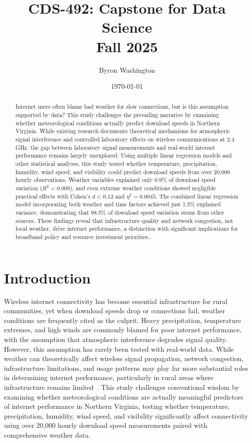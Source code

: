 \documentclass[10pt,final,journal,compsoc,letterpaper,twocolumn]{IEEEtran}
\begin{document}
\title{CDS-492:  Capstone for Data Science \\ Fall 2025}
\author{Byron Washington}
\date{\today}
\maketitle

\begin{abstract}
Internet users often blame bad weather for slow connections, but is this assumption supported by data? This study challenges the prevailing narrative by examining whether meteorological conditions actually predict download speeds in Northern Virginia. While existing research documents theoretical mechanisms for atmospheric signal interference and controlled laboratory effects on wireless communications at 2.4 GHz, the gap between laboratory signal measurements and real-world internet performance remains largely unexplored. Using multiple linear regression models and other statistical analyses, this study tested whether temperature, precipitation, humidity, wind speed, and visibility could predict download speeds from over 20,000 hourly observations. Weather variables explained only 0.9\% of download speed variation ($R^2 = 0.009$), and even extreme weather conditions showed negligible practical effects with Cohen's $d < 0.12$ and $\eta^2 = 0.0045$. The combined linear regression model incorporating both weather and time factors achieved just 1.5\% explained variance, demonstrating that 98.5\% of download speed variation stems from other sources. These findings reveal that infrastructure quality and network congestion, not local weather, drive internet performance, a distinction with significant implications for broadband policy and resource investment priorities..
\end{abstract}

\tableofcontents

\section{Introduction}

Wireless internet connectivity has become essential infrastructure for rural communities, yet when download speeds drop or connections fail, weather conditions are frequently cited as the culprit. Heavy precipitation, temperature extremes, and high winds are commonly blamed for poor internet performance, with the assumption that atmospheric interference degrades signal quality. However, this assumption has rarely been tested with real-world data. While weather can theoretically affect wireless signal propagation, network congestion, infrastructure limitations, and usage patterns may play far more substantial roles in determining internet performance, particularly in rural areas where infrastructure remains limited~\cite{changelabsolutions2024broadband}. This study challenges conventional wisdom by examining whether meteorological conditions are actually meaningful predictors of internet performance in Northern Virginia, testing whether temperature, precipitation, humidity, wind speed, and visibility significantly affect connectivity using over 20,000 hourly download speed measurements paired with comprehensive weather data.
\end{document}
